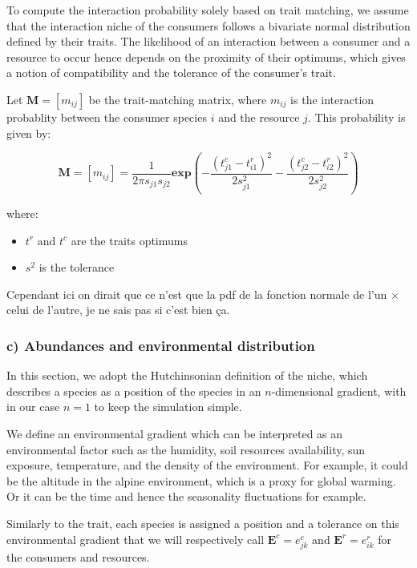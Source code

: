 To compute the interaction probability solely based on trait matching, we assume that the interaction niche of the consumers follows a bivariate normal distribution defined by their traits. The likelihood of an interaction between a consumer and a resource to occur hence depends on the proximity of their optimums, which gives a notion of compatibility and the tolerance of the consumer's trait.

Let $\mathbf{M} = [m_{ij}]$ be the trait-matching matrix, where $m_{ij}$ is the interaction probablity between the consumer species $i$ and the resource $j$. This probability is given by:

$$
    \mathbf{M} = [m_{ij}]=\frac{1}{2\pi s_{j1}s_{j2}} \mathbf{exp}\left(-\frac{(t^c_{j1} - t^r_{i1})^2}{2s^2_{j1}} - \frac{(t^c_{j2} - t^r_{i2})^2}{2s^2_{j2}}\right)
$$

where:
\begin{itemize}
    \item $t^r \text{ and }t^c$ are the traits optimums
    \item $s^2$ is the tolerance
\end{itemize}

Cependant ici on dirait que ce n'est que la pdf de la fonction normale de l'un $\times$ celui de l'autre, je ne sais pas si c'est bien ça.




\subsubsection{c) Abundances and environmental distribution}



In this section, we adopt the  Hutchinsonian definition of the niche, which describes a species as a position of the species in an $n$-dimensional gradient, with in our case $n=1$ to keep the simulation simple.

We define an environmental gradient which can be interpreted as an environmental factor such as the humidity, soil resources availability, sun exposure, temperature, and the density of the environment. For example, it could be the altitude in the alpine environment, which is a proxy for global warming. Or it can be the time and hence the seasonality fluctuations for example.

Similarly to the trait, each species is assigned a position and a tolerance on this environmental gradient that we will respectively call $\mathbf{E}^c = e_{jk}^c$ and $\mathbf{E}^r = e_{ik}^r$ for the consumers and resources.

